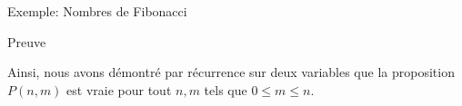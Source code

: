 \documentclass[a4paper]{article}
\begin{document}
\begin{parag}{Exemple: Nombres de Fibonacci}
\begin{subparag}{Preuve}
\begin{enumerate}[left=0pt]
             Ainsi, nous avons démontré par récurrence sur deux variables que la proposition $P\left(n, m\right)$ est vraie pour tout $n, m$ tels que $0 \leq m \leq n$.
        \end{enumerate}
    \end{subparag}
\end{parag}
\end{document}
